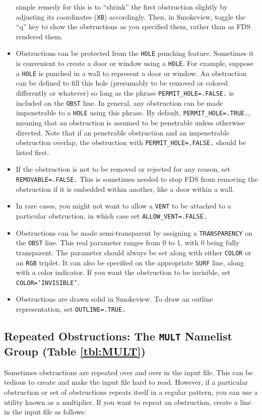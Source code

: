 \documentclass[11pt]{book}
\newcommand{\ct}{\tt\small}
\begin{document}
\begin{itemize}
simple remedy for this is to ``shrink'' the first obstruction slightly by adjusting its coordinates ({\ct XB}) accordingly. Then, in
Smokeview, toggle the ``q'' key to show the obstructions as you specified them, rather than as FDS rendered them.
\item Obstructions can be protected from the {\ct HOLE} punching feature. Sometimes
it is convenient to create a door or window using a {\ct HOLE}. For example, suppose a
{\ct HOLE} is punched in a wall to represent a door or window. An obstruction can be
defined to fill this hole (presumably to be removed or colored differently or whatever) so
long as the phrase {\ct PERMIT\_HOLE=.FALSE.} is included on the {\ct OBST} line. In general,
any obstruction can be made impenetrable to a {\ct HOLE} using this phrase. By default,
{\ct PERMIT\_HOLE=.TRUE.}, meaning that an obstruction is assumed to be penetrable unless otherwise directed. Note that if an penetrable  obstruction
and an impenetrable  obstruction overlap, the obstruction with {\ct PERMIT\_HOLE=.FALSE.} should be listed first.
\item If the obstruction is not to be removed or rejected for any reason, set {\ct REMOVABLE=.FALSE.} This is sometimes needed to stop
FDS from removing the obstruction if it is embedded within another, like a door within a wall.
\item In rare cases, you might not want to allow a {\ct VENT} to be attached to a particular obstruction, in which case set
{\ct ALLOW\_VENT=.FALSE.}
\item Obstructions can be made semi-transparent by assigning a {\ct TRANSPARENCY} on the {\ct OBST} line. This real parameter ranges from
0 to 1, with 0 being fully transparent. The parameter should always be set along with either {\ct COLOR} or an {\ct RGB} triplet. It can
also be specified on the appropriate {\ct SURF} line, along with a color indicator. If you want the obstruction to be invisible, set {\ct COLOR='INVISIBLE'}.
\item Obstructions are drawn solid in Smokeview. To draw an outline representation, set {\ct OUTLINE=.TRUE.}
\end{itemize}


\subsection{Repeated Obstructions: The \texorpdfstring{{\tt MULT}}{MULT} Namelist Group (Table \ref{tbl:MULT})}
\label{info:MULT}

Sometimes obstructions are repeated over and over in the input file. This can be tedious to create and make the input file hard to read. However,
if a particular obstruction or set of obstructions repeats itself in a regular pattern, you can use a utility known as a multiplier. If you want to
repeat an obstruction, create a line in the input file as follows:
\end{document}
